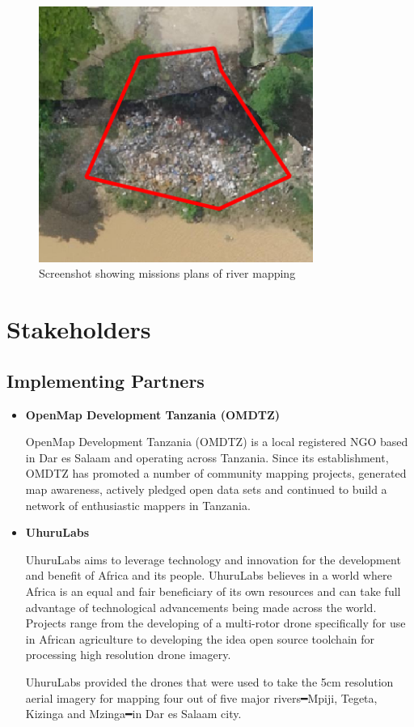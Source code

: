 \documentclass[a4paper,12pt,twoside]{article}
\begin{document}
        \begin{figure}%
            \centering
            \includegraphics[width=0.8\textwidth]{images/image17.png}
            \caption{Screenshot showing missions plans of river mapping}
        \end{figure}

\section{Stakeholders}

\subsection{Implementing Partners}

    \begin{itemize}
        \item \textbf{OpenMap Development Tanzania (OMDTZ)} %
    
        OpenMap Development Tanzania (OMDTZ) is a local registered NGO based in Dar es Salaam and operating across Tanzania. Since its establishment, OMDTZ has promoted a number of community mapping projects, generated map awareness, actively pledged open data sets and continued to build a network of enthusiastic mappers in Tanzania.
    
        \item \textbf{UhuruLabs}
    
        UhuruLabs aims to leverage technology and innovation for the development and benefit of Africa and its people. UhuruLabs believes in a world where Africa is an equal and fair beneficiary of its own resources and can take full advantage of technological advancements being made across the world. Projects range from the developing of a multi-rotor drone specifically for use in African agriculture to developing the idea open source toolchain for processing high resolution drone imagery. 
    
        UhuruLabs provided the drones that were used to take the 5cm resolution aerial imagery for mapping four out of five major rivers━Mpiji, Tegeta, Kizinga and Mzinga━in Dar es Salaam city.
    
    \end{itemize}
\end{document}
